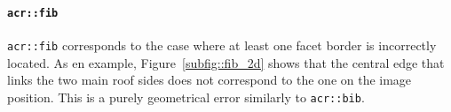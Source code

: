             \paragraph{\texttt{\acrlong*{acr::fib}}}
                \texttt{\gls{acr::fib}} corresponds to the case where at least one facet border is incorrectly located.
                As en example, Figure~\ref{subfig::fib_2d} shows that the central edge that links the two main roof sides does not correspond to the one on the image position.
                This is a purely geometrical error similarly to \texttt{\gls{acr::bib}}.\\

                \begin{figure}[htbp]
                    \centering
\end{figure}
